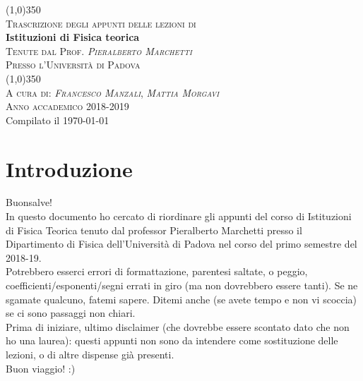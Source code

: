 \documentclass[12pt]{report}
\begin{document}
\setlength{\aboverulesep}{0pt}
\setlength{\belowrulesep}{0pt}
\setlength{\extrarowheight}{.75ex}
\begin{center}
		\line (1,0){350} \\
		\textsc{\normalsize Trascrizione degli appunti delle lezioni di}\\
		[0.25in]
		\huge{\bfseries Istituzioni di Fisica teorica}\\
		[2mm]
		\textsc{\normalsize Tenute dal Prof. \textit{Pieralberto Marchetti}}
		\vspace{-0.5em}\\
		\textsc{\normalsize Presso l'Università di Padova}\\
		\vspace{-1em}
		\line (1,0){350} \\
        [0.2cm]
        \textsc{\normalsize A cura di: \textit{Francesco Manzali}, \textit{Mattia Morgavi}}\\
		\textsc{\normalsize Anno accademico 2018-2019}\\ 
        {\scriptsize Compilato il \today}
\end{center}


\makeatletter
\renewcommand{\@marginparreset}{%
  \reset@font\small
  \raggedright
  \slshape
  \@setminipage
}
\makeatother

\tableofcontents 
\clearpage
\chapter*{Introduzione}
Buonsalve!\\
In questo documento ho cercato di riordinare gli appunti del corso di Istituzioni di Fisica Teorica tenuto dal professor Pieralberto Marchetti  presso il Dipartimento di Fisica dell'Università di Padova nel corso del primo semestre del 2018-19.\\
Potrebbero esserci errori di formattazione, parentesi saltate, o peggio, coefficienti/esponenti/segni errati in giro (ma non dovrebbero essere tanti). Se ne sgamate qualcuno, fatemi sapere. Ditemi anche (se avete tempo e non vi scoccia) se ci sono passaggi non chiari.\\
Prima di iniziare, ultimo disclaimer (che dovrebbe essere scontato dato che non ho una laurea): questi appunti non sono da intendere come sostituzione delle lezioni, o di altre dispense già presenti.\\
Buon viaggio! :)
\end{document}
